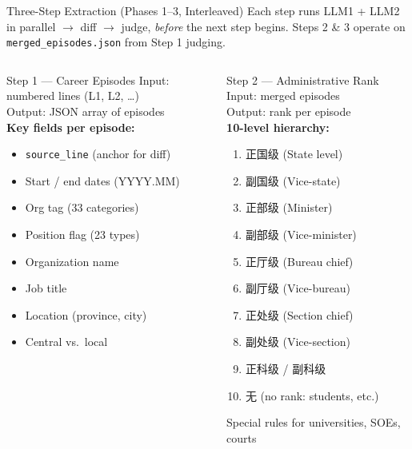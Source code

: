 \documentclass[aspectratio=169, 10pt]{beamer}
\begin{document}
\begin{frame}[shrink=18]{Three-Step Extraction (Phases 1--3, Interleaved)}
  Each step runs LLM1 + LLM2 in parallel $\to$ diff $\to$ judge, \emph{before} the next step begins.
  Steps 2 \& 3 operate on \texttt{merged\_episodes.json} from Step 1 judging.

  \medskip
  \setlength{\columnsep}{10pt}
  \begin{columns}[T,onlytextwidth]
    \begin{block}{Step 1 — Career Episodes}
      \small
      Input: numbered lines (L1, L2, \ldots)\\[4pt]
      Output: JSON array of episodes\\[4pt]
      \textbf{Key fields per episode:}
      \begin{itemize}\scriptsize
        \item \texttt{source\_line} (anchor for diff)
        \item Start / end dates (YYYY.MM)
        \item Org tag (33 categories)
        \item Position flag (23 types)
        \item Organization name
        \item Job title
        \item Location (province, city)
        \item Central vs.\ local
      \end{itemize}
    \end{block}

    \begin{block}{Step 2 — Administrative Rank}
      \small
      Input: merged episodes\\[4pt]
      Output: rank per episode\\[4pt]
      \textbf{10-level hierarchy:}
      \begin{enumerate}\scriptsize
        \item 正国级 (State level)
        \item 副国级 (Vice-state)
        \item 正部级 (Minister)
        \item 副部级 (Vice-minister)
        \item 正厅级 (Bureau chief)
        \item 副厅级 (Vice-bureau)
        \item 正处级 (Section chief)
        \item 副处级 (Vice-section)
        \item 正科级 / 副科级
        \item 无 (no rank: students, etc.)
      \end{enumerate}
      Special rules for universities, SOEs, courts
    \end{block}


\end{columns}
\end{frame}
\end{document}
